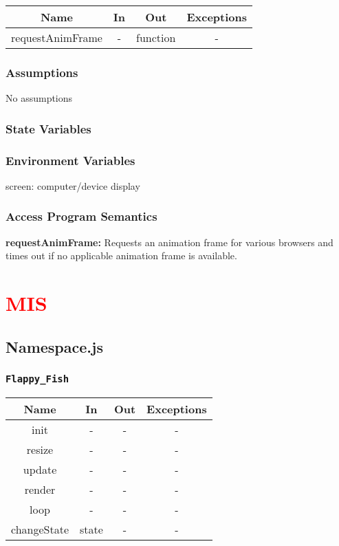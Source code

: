 \documentclass[11pt, oneside]{article}   	%
\begin{document}
\begin{center}
\begin{tabular}{ |c|c|c|c| } 
 \hline
 Name & In & Out & Exceptions \\ 
 \hline \hline
 requestAnimFrame & - & function & - \\ 
 \hline
\end{tabular}
\end{center}

\subsubsection{Assumptions}
No assumptions

\subsubsection{State Variables}
\subsubsection{Environment Variables}
screen: computer/device display

\subsubsection{Access Program Semantics} 
 \textbf{requestAnimFrame:} Requests an animation frame for various browsers and times out if no applicable animation frame is available.

\section{\textcolor{red}{MIS}}
\subsection{Namespace.js}
\subsubsection{\texttt{Flappy\_Fish}}

\begin{center}
\begin{tabular}{ |c|c|c|c| } 
 \hline
 Name & In & Out & Exceptions \\ 
 \hline \hline
 init & - & - & - \\ 
 resize & - & - & - \\ 
 update & - & - & - \\ 
 render & - & - & - \\ 
 loop & - & - & - \\ 
 changeState & state & - & - \\ 
 \hline
\end{tabular}
\end{center}
\end{document}
